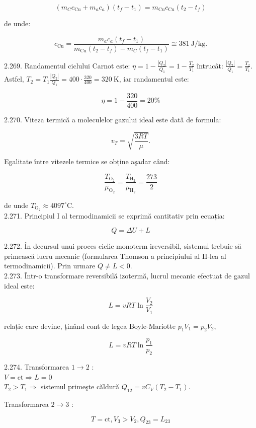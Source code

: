 \documentclass[10pt]{article}
\begin{document}
$$
\left(m_{C} c_{\mathrm{Cu}}+m_{a} c_{a}\right)\left(t_{f}-t_{1}\right)=m_{\mathrm{Cu}} c_{\mathrm{Cu}}\left(t_{2}-t_{f}\right)
$$

de unde:

$$
c_{\mathrm{Cu}}=\frac{m_{a} c_{a}\left(t_{f}-t_{1}\right)}{m_{\mathrm{Cu}}\left(t_{2}-t_{f}\right)-m_{C}\left(t_{f}-t_{1}\right)} \cong 381 \mathrm{~J} / \mathrm{kg} .
$$

2.269. Randamentul ciclului Carnot este: $\eta=1-\frac{\left|Q_{2}\right|}{Q_{1}}=1-\frac{T_{2}}{T_{1}}$ întrucât: $\frac{\left|Q_{2}\right|}{Q_{1}}=\frac{T_{2}}{T_{1}}$. Astfel, $T_{2}=T_{1} \frac{\left|Q_{2}\right|}{Q_{1}}=400 \cdot \frac{320}{400}=320 \mathrm{~K}$, iar randamentul este:

$$
\eta=1-\frac{320}{400}=20 \%
$$

2.270. Viteza termică a moleculelor gazului ideal este dată de formula:

$$
v_{T}=\sqrt{\frac{3 R T}{\mu}} .
$$

Egalitate între vitezele termice se obține aşadar când:

$$
\frac{T_{\mathrm{O}_{2}}}{\mu_{\mathrm{O}_{2}}}=\frac{T_{\mathrm{H}_{2}}}{\mu_{\mathrm{H}_{2}}}=\frac{273}{2}
$$

de unde $T_{\mathrm{O}_{2}} \approx 4097^{\circ} \mathrm{C}$.\\
2.271. Principiul I al termodinamicii se exprimă cantitativ prin ecuația:

$$
Q=\Delta U+L
$$

2.272. În decursul unui proces ciclic monoterm ireversibil, sistemul trebuie să primească lucru mecanic (formularea Thomson a principiului al II-lea al termodinamicii). Prin urmare $Q \neq L<0$.\\
2.273. Într-o transformare reversibilă izotermă, lucrul mecanic efectuat de gazul ideal este:

$$
L=v R T \ln \frac{V_{2}}{V_{1}}
$$

relație care devine, ținând cont de legea Boyle-Mariotte $p_{1} V_{1}=p_{2} V_{2}$,

$$
L=v R T \ln \frac{p_{1}}{p_{2}}
$$

2.274. Transformarea $1 \rightarrow 2$ :\\
$V=\mathrm{ct} \Rightarrow L=0$\\
$T_{2}>T_{1} \Rightarrow$ sistemul primeşte căldură $Q_{12}=v C_{V}\left(T_{2}-T_{1}\right)$.

Transformarea $2 \rightarrow 3$ :

$$
T=\mathrm{ct}, V_{3}>V_{2}, Q_{23}=L_{23}
$$
\end{document}
